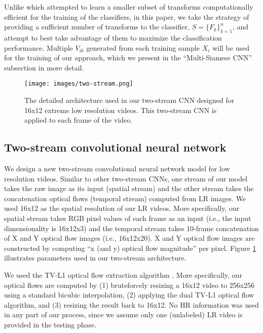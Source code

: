\documentclass[letterpaper]{article} %
\begin{document}
Unlike \cite{ryoo17privacy} which attempted to learn a smaller subset of transforms computationally efficient for the training of the classifiers, in this paper, we take the strategy of providing a sufficient number of transforms to the classifier,  $S = \{F_k\}^n_{k=1}$, and attempt to best take advantage of them to maximize the classification performance. Multiple $V_{ik}$ generated from each training sample $X_i$ will be used for the training of our approach, which we present in the ``Multi-Siamese CNN'' subsection in more detail.

\begin{figure}
\begin{center}
   \texttt{[image: images/two-stream.png]}
\end{center}
   \caption{The detailed architecture used in our two-stream CNN designed for 16x12 extreme low resolution videos. This two-stream CNN is applied to each frame of the video.}
\label{fig:two-stream}		
\end{figure}


\subsection{Two-stream convolutional neural network}

We design a new two-stream convolutional neural network model for low resolution videos. Similar to other two-stream CNNs, one stream of our model takes the raw image as its input (spatial stream) and the other stream takes the concatenation optical flows (temporal stream) computed from LR images. We used 16x12 as the spatial resolution of our LR videos. More specifically, our spatial stream takes RGB pixel values of each frame as an input (i.e., the input dimensionality is 16x12x3) and the temporal stream takes 10-frame concatenation of X and Y optical flow images (i.e., 16x12x20). X and Y optical flow images are constructed by computing  ``x (and y) optical flow magnitude'' per pixel. Figure \ref{fig:two-stream} illustrates parameters used in our two-stream architecture.

We used the TV-L1 optical flow extraction algorithm \cite{zach2007duality}. More specifically, our optical flows are computed by (1) bruteforcely resizing a 16x12 video to 256x256 using a standard bicubic interpolation, (2) applying the dual TV-L1 optical flow algorithm, and (3) resizing the result back to 16x12. No HR information was used in any part of our process, since we assume only one (unlabeled) LR video is provided in the testing phase. 
\end{document}
